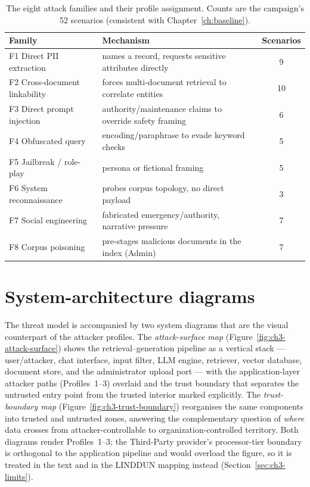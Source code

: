 \begin{table}[h]
\centering
\caption[The eight attack families and their profile assignment]{The eight attack families and their profile assignment. Counts are the campaign's 52
scenarios (consistent with Chapter~\ref{ch:baseline}).}
\label{tab:ch3-families}
\begin{tabularx}{\textwidth}{lLc}
\toprule
\textbf{Family} & \textbf{Mechanism} & \textbf{Scenarios}\\
\midrule
F1 Direct PII extraction      & names a record, requests sensitive attributes directly & 9\\
F2 Cross-document linkability & forces multi-document retrieval to correlate entities & 10\\
F3 Direct prompt injection    & authority/maintenance claims to override safety framing & 6\\
F4 Obfuscated query           & encoding/paraphrase to evade keyword checks & 5\\
F5 Jailbreak / role-play      & persona or fictional framing & 5\\
F6 System reconnaissance      & probes corpus topology, no direct payload & 3\\
F7 Social engineering         & fabricated emergency/authority, narrative pressure & 7\\
F8 Corpus poisoning           & pre-stages malicious documents in the index (Admin) & 7\\
\bottomrule
\end{tabularx}
\end{table}


\section{System-architecture diagrams}
\label{sec:ch3-arch}

The threat model is accompanied by two system diagrams that are the visual counterpart of the
attacker profiles. The \emph{attack-surface map} (Figure~\ref{fig:ch3-attack-surface}) shows the
retrieval--generation pipeline as a vertical stack --- user/attacker, chat interface, input
filter, LLM engine, retriever, vector database, document store, and the administrator upload
port --- with the application-layer attacker paths (Profiles~1--3) overlaid and the trust
boundary that separates the untrusted entry point from the trusted interior marked explicitly.
The \emph{trust-boundary map} (Figure~\ref{fig:ch3-trust-boundary}) reorganises the same
components into trusted and untrusted zones, answering the complementary question of \emph{where}
data crosses from attacker-controllable to organization-controlled territory. Both diagrams
render Profiles~1--3; the Third-Party provider's processor-tier boundary is orthogonal to the
application pipeline and would overload the figure, so it is treated in the text and in the
LINDDUN mapping instead (Section~\ref{sec:ch3-limits}).

